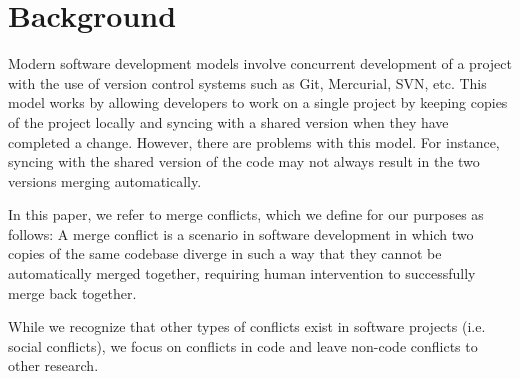 \section{Background}\label{background}


Modern software development models involve concurrent development of a project with the use of version control systems such as Git, Mercurial, SVN, etc. This model works by allowing developers to work on a single project by keeping copies of the project locally and syncing with a shared version when they have completed a change. However, there are problems with this model. For instance, syncing with the shared version of the code may not always result in the two versions merging automatically.

In this paper, we refer to merge conflicts, which we define for our purposes as follows:
A merge conflict is a scenario in software development in which two copies of the same codebase diverge in such a way that they cannot be automatically merged together, requiring human intervention to successfully merge back together. 

While we recognize that other types of conflicts exist in software projects (i.e. social conflicts), we focus on conflicts in code and leave non-code conflicts to other research.